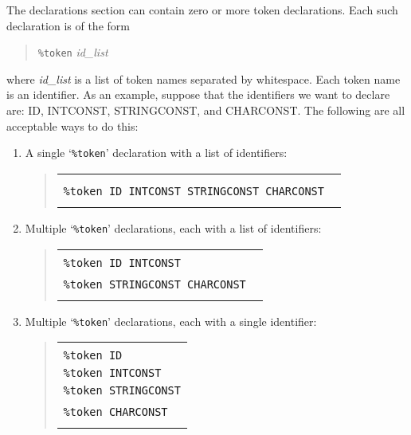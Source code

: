 \documentclass{article}
\begin{document}
The declarations section can contain zero or more
token declarations.  Each such declaration is of the form
%
\begin{quote}
{\tt \%token} {\em id\_list}
\end{quote}
%
where {\em id\_list} is a list of token names
separated by whitespace.  Each token name is an identifier.
As an example, suppose that the identifiers we want to declare are: ID,
INTCONST, STRINGCONST, and CHARCONST.  The following are all acceptable ways
to do this:
%
\begin{enumerate}
\item
A single `{\tt \%token}' declaration with a list of identifiers:
\begin{quote}
\begin{tabular}{|l|}\hline
\begin{minipage}{3.5in}
\ \\
{\tt \%token ID INTCONST STRINGCONST CHARCONST}
\ \\
\end{minipage}
\\ \hline
\end{tabular}
\end{quote}

\item
Multiple `{\tt \%token}' declarations, each with a list of identifiers:
\begin{quote}
\begin{tabular}{|l|}\hline
\begin{minipage}{3.5in}
\ \\
{\tt \%token ID INTCONST}\\
{\tt \%token STRINGCONST CHARCONST}
\ \\
\end{minipage}
\\ \hline
\end{tabular}
\end{quote}

\item
Multiple `{\tt \%token}' declarations, each with a single identifier:
\begin{quote}
\begin{tabular}{|l|}\hline
\begin{minipage}{3.5in}
\ \\
{\tt \%token ID}\\
{\tt \%token INTCONST}\\
{\tt \%token STRINGCONST}\\
{\tt \%token CHARCONST}
\ \\
\end{minipage}
\\ \hline
\end{tabular}
\end{quote}
\end{enumerate}
\end{document}

